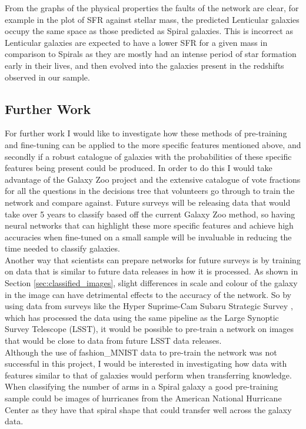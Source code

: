 \documentclass[12pt, onecolumn]{aa}
\begin{document}
From the graphs of the physical properties the faults of the network are clear, for example in the plot of SFR against stellar mass, the predicted Lenticular galaxies occupy the same space as those predicted as Spiral galaxies. This is incorrect as Lenticular galaxies are expected to have a lower SFR for a given mass in comparison to Spirals as they are mostly had an intense period of star formation early in their lives, and then evolved into the galaxies present in the redshifts observed in our sample.\\

\subsection{Further Work}
For further work I would like to investigate how these methods of pre-training and fine-tuning can be applied to the more specific features mentioned above, and secondly if a robust catalogue of galaxies with the probabilities of these specific features being present could be produced. In order to do this I would take advantage of the Galaxy Zoo project and the extensive catalogue of vote fractions for all the questions in the decisions tree that volunteers go through to train the network and compare against. Future surveys will be releasing data that would take over 5 years to classify based off the current Galaxy Zoo method, so having neural networks that can highlight these more specific features and achieve high accuracies when fine-tuned on a small sample will be invaluable in reducing the time needed to classify galaxies.\\

Another way that scientists can prepare networks for future surveys is by training on data that is similar to future data releases in how it is processed. As shown in Section \ref{sec:classified_images}, slight differences in scale and colour of the galaxy in the image can have detrimental effects to the accuracy of the network. So by using data from surveys like the Hyper Suprime-Cam Subaru Strategic Survey \citep{2018PASJ...70S...8A}, which has processed the data using the same pipeline as the Large Synoptic Survey Telescope (LSST), it would be possible to pre-train a network on images that would be close to data from future LSST data releases. \\

Although the use of fashion\_MNIST data to pre-train the network was not successful in this project, I would be interested in investigating how data with features similar to that of galaxies would perform when transferring knowledge. When classifying the number of arms in a Spiral galaxy a good pre-training sample could be images of hurricanes from the American National Hurricane Center as they have that spiral shape that could transfer well across the galaxy data. 
\end{document}
